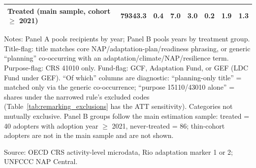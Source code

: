 \begin{table}[H]
{\begin{tabular}{lccccccc}
\quad Treated (main sample, cohort $\geq$ 2021) & 79343.3 & 0.4 & 7.0 & 3.0 & 0.2 & 1.9 & 1.3 \\
\bottomrule
\end{tabular}
}
\endgroup
\par\vspace{4pt}
\begin{minipage}{\linewidth}\footnotesize
Notes: Panel A pools recipients by year; Panel B pools years by treatment group. Title-flag: title matches core NAP/adaptation-plan/readiness phrasing, or generic ``planning'' co-occurring with an adaptation/climate/NAP/resilience term. Purpose-flag: CRS 41010 only. Fund-flag: GCF, Adaptation Fund, or GEF (LDC Fund under GEF). ``Of which'' columns are diagnostic: ``planning-only title'' = matched only via the generic co-occurrence; ``purpose 15110/43010 alone'' = shares under the narrowed rule's excluded codes (Table~\ref{tab:remarking_exclusions} has the ATT sensitivity). Categories not mutually exclusive. Panel B groups follow the main estimation sample: treated = 40 adopters with adoption year $\geq$ 2021, never-treated = 86; thin-cohort adopters are not in the main sample and are not shown.\par
Source: OECD CRS activity-level microdata, Rio adaptation marker 1 or 2; UNFCCC NAP Central.
\end{minipage}
\end{table}
